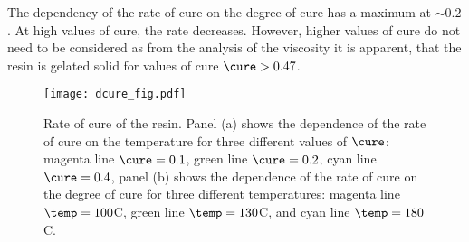 \documentclass[twoside,a4paper,12pt]{article}
\begin{document}
The dependency of the rate of cure on the degree of cure has a maximum at $\sim 0.2$. At high values of cure, the rate decreases. However, higher values of cure do not need to be considered as from the analysis of the viscosity it is apparent, that the resin is gelated solid for values of cure $\cure > 0.47$.

\begin{figure}
  \centering
  \texttt{[image: dcure\_fig.pdf]}
  \caption{Rate of cure of the resin. Panel (a) shows the dependence of the
    rate of cure on the temperature for three different values of
    $\cure$: magenta line $\cure=0.1$, green line $\cure=0.2$, cyan
    line $\cure=0.4$, panel (b) shows the dependence of the rate of cure 
    on the degree of cure for three different temperatures: magenta
    line $\temp = 100$\degree C, green line $\temp = 130$\degree C, and cyan line
    $\temp = 180$\degree C.}
  \label{fig:cure}
\end{figure}
\end{document}
